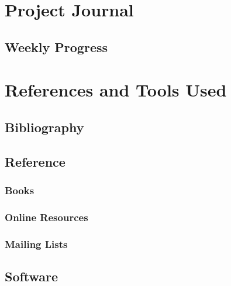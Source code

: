 \documentclass[a4paper,12pt]{report}
\begin{document}
\chapter{Project Journal}

\section{Weekly Progress}


\chapter{References and Tools Used}

\section{Bibliography}

\section{Reference}

%

\subsection{Books}



\subsection{Online Resources}



\subsection{Mailing Lists}

%

\section{Software}


\end{document}

